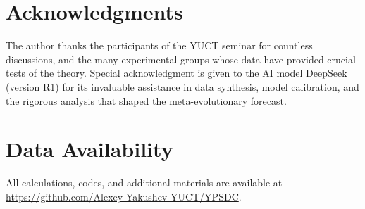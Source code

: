 \documentclass[12pt,a4paper]{article}
\theoremstyle{remark}
\begin{document}
	\section*{Acknowledgments}
	
	The author thanks the participants of the YUCT seminar for countless discussions, and the many experimental groups whose data have provided crucial tests of the theory. Special acknowledgment is given to the AI model DeepSeek (version R1) for its invaluable assistance in data synthesis, model calibration, and the rigorous analysis that shaped the meta-evolutionary forecast.
	
	\section*{Data Availability}
	
	All calculations, codes, and additional materials are available at \url{https://github.com/Alexey-Yakushev-YUCT/YPSDC}.
	
\end{document}
